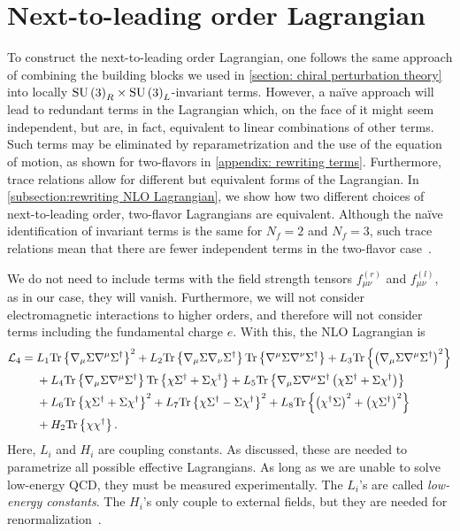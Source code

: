 \section{Next-to-leading order Lagrangian}
\label{section: nlo chpt}


To construct the next-to-leading order Lagrangian, one follows the same approach of combining the building blocks we used in \autoref{section: chiral perturbation theory} into locally $\text{SU}\left(3\right)_R\times\text{SU}\left(3\right)_L$-invariant terms.
However, a naïve approach will lead to redundant terms in the Lagrangian which, on the face of it might seem independent, but are, in fact, equivalent to linear combinations of other terms.
Such terms may be eliminated by reparametrization and the use of the equation of motion, as shown for two-flavors in \autoref{appendix: rewriting terms}.
Furthermore, trace relations allow for different but equivalent forms of the Lagrangian.
In \autoref{subsection:rewriting NLO Lagrangian}, we show how two different choices of next-to-leading order, two-flavor Lagrangians are equivalent.
Although the naïve identification of invariant terms is the same for $N_f = 2$ and $N_f=3$, such trace relations mean that there are fewer independent terms in the two-flavor case~\autocite{schererIntroductionChiralPerturbation2002}.

We do not need to include terms with the field strength tensors $f_{\mu\nu}^{(r)}$ and $f_{\mu\nu}^{(l)}$, as in our case, they will vanish.
Furthermore, we will not consider electromagnetic interactions to higher orders, and therefore will not consider terms including the fundamental charge $e$.
With this, the NLO Lagrangian is~\autocite{gasserChiralPerturbationTheory1985}
%
\begin{align}
    \label{NLO Lagrangian three flavor}
    \nonumber
    \mathcal{L}_4 
    ={} &
    L_1\text{Tr} \left\{ \nabla_\mu \Sigma \nabla^\mu \Sigma^\dagger \right\}^2
    + L_2 \text{Tr} \left\{ \nabla_\mu \Sigma \nabla_\nu \Sigma^\dagger \right\} 
    \text{Tr} \left\{ \nabla^\mu \Sigma \nabla^\nu \Sigma^\dagger \right\}
    + L_3 \text{Tr} \left\{ \left(\nabla_\mu \Sigma \nabla^\mu \Sigma^\dagger\right)^2 \right\} \\ \nonumber
    & + L_4 \text{Tr} \left\{ \nabla_\mu \Sigma \nabla^\mu \Sigma^\dagger \right\} 
    \text{Tr} \left\{ \chi \Sigma^\dagger + \Sigma \chi^\dagger \right\}
    + L_5 \text{Tr} \left\{ 
        \nabla_\mu \Sigma \nabla^\mu \Sigma^\dagger 
        \left(\chi \Sigma^\dagger + \Sigma \chi^\dagger\right)
     \right\}\\\nonumber
    &+ L_6 \text{Tr} \left\{ \chi \Sigma^\dagger + \Sigma \chi^\dagger \right\}^2 
     + L_7 \text{Tr} \left\{ \chi \Sigma^\dagger - \Sigma \chi^\dagger \right\}^2
    + L_8 \text{Tr} \left\{  \left(\chi^\dagger \Sigma \right)^2 + \left(\chi \Sigma^\dagger \right)^2 \right\}\\
    &+ H_2 \text{Tr} \left\{ \chi \chi^\dagger \right\}.
\end{align}
%
Here, $L_i$ and $H_i$ are coupling constants.
As discussed, these are needed to parametrize all possible effective Lagrangians.
As long as we are unable to solve low-energy QCD, they must be measured experimentally.
The $L_i$'s are called \emph{low-energy constants}.
The $H_i$'s only couple to external fields, but they are needed for renormalization~\autocite{gasserChiralPerturbationTheory1985}.

